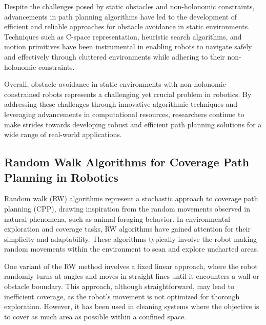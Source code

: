 \vspace*{6mm}

Despite the challenges posed by static obstacles and non-holonomic constraints, advancements in path planning algorithms have led to the development of efficient and reliable approaches for obstacle avoidance in static environments. Techniques such as C-space representation, heuristic search algorithms, and motion primitives have been instrumental in enabling robots to navigate safely and effectively through cluttered environments while adhering to their non-holonomic constraints.

\vspace*{6mm}

Overall, obstacle avoidance in static environments with non-holonomic constrained robots represents a challenging yet crucial problem in robotics. By addressing these challenges through innovative algorithmic techniques and leveraging advancements in computational resources, researchers continue to make strides towards developing robust and efficient path planning solutions for a wide range of real-world applications.


\subsection{Random Walk Algorithms for Coverage Path Planning in Robotics}

Random walk (RW) algorithms represent a stochastic approach to coverage path planning (CPP), drawing inspiration from the random movements observed in natural phenomena, such as animal foraging behavior. In environmental exploration and coverage tasks, RW algorithms have gained attention for their simplicity and adaptability. These algorithms typically involve the robot making random movements within the environment to scan and explore uncharted areas.

\vspace*{6mm}

One variant of the RW method involves a fixed linear approach, where the robot randomly turns at angles and moves in straight lines until it encounters a wall or obstacle boundary. This approach, although straightforward, may lead to inefficient coverage, as the robot's movement is not optimized for thorough exploration. However, it has been used in cleaning systems where the objective is to cover as much area as possible within a confined space.

\vspace*{6mm}

